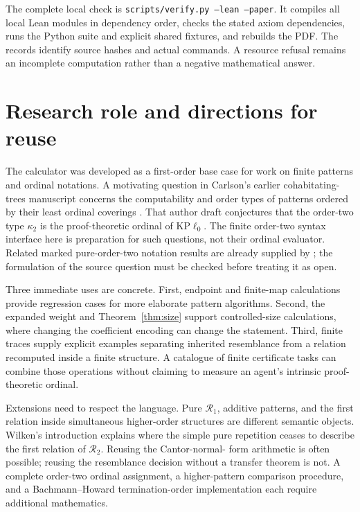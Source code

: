 \documentclass[11pt]{article}
\begin{document}
The complete local check is \texttt{scripts/verify.py --lean --paper}.
It compiles all local Lean modules in dependency order, checks the stated
axiom dependencies, runs the Python suite and explicit shared fixtures,
and rebuilds the PDF. The records identify source hashes and actual
commands. A resource refusal remains an incomplete computation rather
than a negative mathematical answer.

\section{Research role and directions for reuse}

The calculator was developed as a first-order base case for work on
finite patterns and ordinal notations. A motivating question in
Carlson's earlier cohabitating-trees manuscript concerns the computability
and order types of patterns ordered by their least ordinal coverings
\cite[Section~5]{CarlsonDraft}. That author draft conjectures that the
order-two type $\kappa_2$ is the proof-theoretic ordinal of
$\mathrm{KP}\ell_0$. The finite order-two syntax interface here is
preparation for such questions, not their ordinal evaluator. Related
marked pure-order-two notation results are already supplied by
\cite{Wilken2018}; the formulation of the source question must be
checked before treating it as open.

Three immediate uses are concrete. First, endpoint and finite-map
calculations provide regression cases for more elaborate pattern
algorithms. Second, the expanded weight and Theorem~\ref{thm:size}
support controlled-size calculations, where changing the coefficient
encoding can change the statement. Third, finite traces supply explicit
examples separating inherited resemblance from a relation recomputed
inside a finite structure. A catalogue of finite certificate tasks can
combine those operations without claiming to measure an agent's
intrinsic proof-theoretic ordinal.

Extensions need to respect the language. Pure $\mathcal R_1$, additive
patterns, and the first relation inside simultaneous higher-order
structures are different semantic objects. Wilken's introduction
\cite{Wilken2021} explains where the simple pure repetition ceases to
describe the first relation of $\mathcal R_2$. Reusing the Cantor-normal-
form arithmetic is often possible; reusing the resemblance decision
without a transfer theorem is not. A complete order-two ordinal
assignment, a higher-pattern comparison procedure, and a Bachmann--Howard
termination-order implementation each require additional mathematics.
\end{document}
